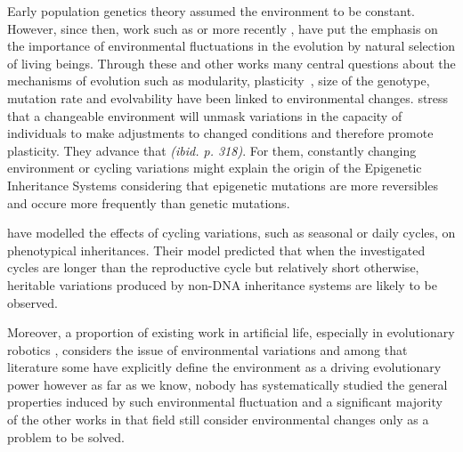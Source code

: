 \documentclass[letterpaper]{article}
\begin{document}
Early population genetics theory assumed the environment to be constant. However, since then, work such as \citep{levins1968evolution} or more recently \citep{jablonka2014evolution}, have put the emphasis on the importance of environmental fluctuations in the evolution by natural selection of living beings. Through these and other works many central questions about the mechanisms of evolution such as modularity, plasticity~\citep{west2005developmental}, size of the genotype, mutation rate and evolvability have been linked to environmental changes. \cite{jablonka2014evolution} stress that a changeable environment will unmask variations in the capacity of individuals to make adjustments to changed conditions and therefore promote plasticity. They advance that \emph{(ibid. p. 318)}. For them, constantly changing environment or cycling variations might explain the origin of the Epigenetic Inheritance Systems  considering that epigenetic mutations are more reversibles and occure more frequently than genetic mutations. 

\cite{lachmann1996inheritance} have modelled the effects of cycling variations, such as seasonal or daily cycles, on phenotypical inheritances. Their model predicted that when the investigated cycles are longer than the reproductive cycle but relatively short otherwise, heritable variations produced by non-DNA inheritance systems are likely to be observed. 

Moreover, a proportion of existing work in artificial life, especially in evolutionary robotics \citep{floreano2000evolutionary}, considers the issue of environmental variations and among that literature some have explicitly define the environment as a driving evolutionary power \citep{bredeche2012environmentdrivenopenende} however as far as we know, nobody has systematically studied the general properties induced by such environmental fluctuation and a significant majority of the other works in that field still consider environmental changes only as a problem to be solved.   %
\end{document}

